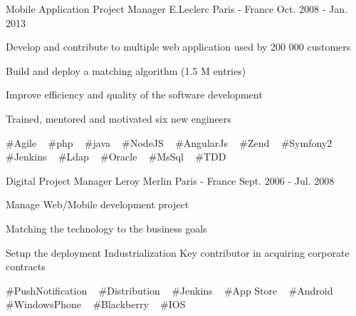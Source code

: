 \begin{cventries}
  \cventry
    {Mobile Application Project Manager} %
    {E.Leclerc} %
    {Paris - France} %
    {Oct. 2008 - Jan. 2013} %
    {
      \begin{cvitems} %
        \item {Develop and contribute to multiple web application used by 200 000 customers}
        \item {Build and deploy a matching algorithm (1.5 M entries)}
        \item {Improve efficiency and quality of the software development}
        \item {Trained, mentored and motivated six new engineers}
      \end{cvitems}
    }
    {
      \#Agile ~
      \#php ~
      \#java ~
      \#NodeJS ~
      \#AngularJs ~
      \#Zend ~
      \#Symfony2 ~
      \#Jenkins ~
      \#Ldap ~
      \#Oracle ~
      \#MsSql ~
      \#TDD
    }

  \cventry
    {Digital Project Manager} %
    {Leroy Merlin} %
    {Paris - France} %
    {Sept. 2006 - Jul. 2008} %
    {
      \begin{cvitems} %
        \item {Manage Web/Mobile development project}
        \item {Matching the technology to the business goals}
        \item {Setup the deployment Industrialization Key contributor in acquiring corporate contracts}
      \end{cvitems}
    }
    {
      \#PushNotification ~
      \#Distribution ~
      \#Jenkins ~
      \#App Store ~
      \#Android ~
      \#WindowsPhone ~
      \#Blackberry ~
      \#IOS
    }

\end{cventries}
